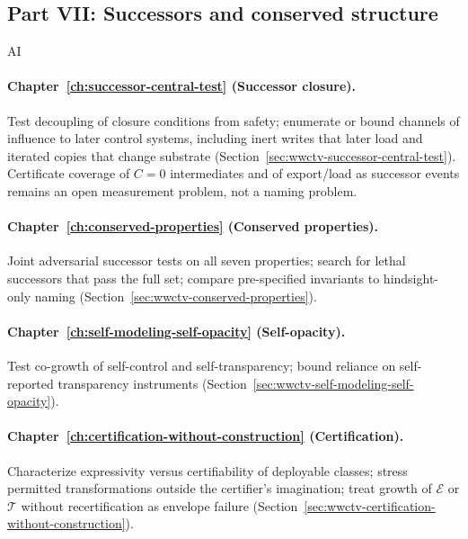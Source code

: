 \subsection{Part VII: Successors and conserved structure}
\begin{authbar}{AI}
\paragraph{Chapter~\ref{ch:successor-central-test} (Successor closure).}
Test decoupling of closure conditions from safety; enumerate or bound channels of influence to later control systems, including inert writes that later load and iterated copies that change substrate (Section~\ref{sec:wwctv-successor-central-test}).
Certificate coverage of \(C=0\) intermediates and of export/load as successor events remains an open measurement problem, not a naming problem.

\paragraph{Chapter~\ref{ch:conserved-properties} (Conserved properties).}
Joint adversarial successor tests on all seven properties; search for lethal successors that pass the full set; compare pre-specified invariants to hindsight-only naming (Section~\ref{sec:wwctv-conserved-properties}).

\paragraph{Chapter~\ref{ch:self-modeling-self-opacity} (Self-opacity).}
Test co-growth of self-control and self-transparency; bound reliance on self-reported transparency instruments (Section~\ref{sec:wwctv-self-modeling-self-opacity}).

\paragraph{Chapter~\ref{ch:certification-without-construction} (Certification).}
Characterize expressivity versus certifiability of deployable classes; stress permitted transformations outside the certifier's imagination; treat growth of \(\mathcal{E}\) or \(\mathcal{T}\) without recertification as envelope failure (Section~\ref{sec:wwctv-certification-without-construction}).

\end{authbar}
\authbarsubneedspace
